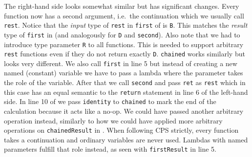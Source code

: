 The right-hand side looks somewhat similar but has significant changes. Every function now has a second argument, i.e.\ the continuation which we usually call \lstinline{rest}. Notice that the \emph{input} type of \lstinline{rest} in \lstinline{first} of  is \lstinline{B}. This matches the \emph{result} type of \lstinline{first} in  (and analogously for \lstinline{D} and \lstinline{second}). Also note that we had to introduce type parameter \lstinline{R} to all functions. This is needed to support arbitrary \lstinline{rest} functions even if they do not return exactly \lstinline{D}. \lstinline{chained} works similarly but looks very different. We also call \lstinline{first} in line 5 but instead of creating a new named (constant) variable we have to pass a lambda where the parameter takes the role of the variable. After that we call \lstinline{second} and pass \lstinline{ret} as \lstinline{rest} which in this case has an equal semantic to the \lstinline{return} statement in line 6 of the left-hand side. In line 10 of  we pass \lstinline{identity} to \lstinline{chained} to mark the end of the calculation because it acts like a no-op. We could have passed another arbitrary operation instead, similarly to how we could have applied more arbitrary operations on \lstinline{chainedResult} in . When following CPS strictly, every function takes a continuation and ordinary variables are never used. Lambdas with named parameters fulfill that role instead, as seen with \lstinline{firstResult} in line 5.

